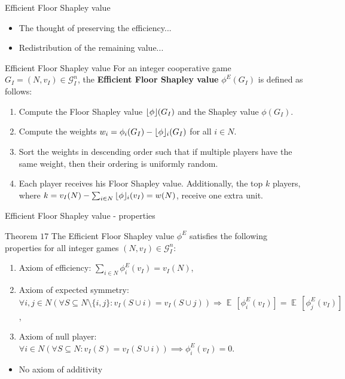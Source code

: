 \documentclass{beamer}
\newcommand{\floor}[1]{\left\lfloor #1 \right\rfloor}
\newcommand{\floorphi}{\ensuremath{\floor{\phi}\hspace{-0.5ex}}}
\DeclareMathOperator{\E}{\mathbb{E}\,}
\begin{document}
\begin{frame}{Efficient Floor Shapley value}
    \begin{itemize}
        \item The thought of preserving the efficiency...
        \item Redistribution of the remaining value...
    \end{itemize}

    \begin{block}{Efficient Floor Shapley value}
        For an integer cooperative game $G_I=(N,v_I) \in \mathcal{G}_I^n$, the \textbf{Efficient Floor Shapley value} $\phi^E(G_I)$ is defined as follows:
        \begin{enumerate}
            \item Compute the Floor Shapley value $\floorphi(G_I)$ and the Shapley value $\phi(G_I)$.
            \item Compute the weights $w_i = \phi_i(G_I) - \floorphi_i(G_I)$ for all $i \in N$.
            \item Sort the weights in descending order such that if multiple players have the same weight, then their ordering is uniformly random.
            \item Each player receives his Floor Shapley value. Additionally, the top $k$ players, where $k = v_I(N) - \sum_{i \in N} \floorphi_i(v_I) = w(N)$, receive one extra unit.
        \end{enumerate}
    \end{block}
\end{frame}



\begin{frame}{Efficient Floor Shapley value - properties}

    \begin{block}{Theorem $17$}
        The Efficient Floor Shapley value $\phi^E$ satisfies the following properties for all integer games $(N,v_I) \in \mathcal{G}_I^n$:
        \begin{enumerate}
            \item Axiom of efficiency: $\sum_{i \in N}\phi_{i}^E(v_I) = v_I(N)$,
            \item Axiom of expected symmetry: $\forall i,j \in N (\forall S \subseteq N \setminus \{i,j\}: v_I(S \cup i) = v_I(S \cup j)) \Rightarrow \E[\phi^E_{i}(v_I)] = \E[\phi^E_{j}(v_I)]$,
            \item Axiom of null player: $\forall i \in N(\forall S \subseteq N: v_I(S)=v_I(S \cup i)) \implies \phi_{i}^E(v_I) = 0$.
        \end{enumerate}
    \end{block}

    \begin{itemize}
        \item No axiom of additivity %
    \end{itemize}
\end{frame}
\end{document}
